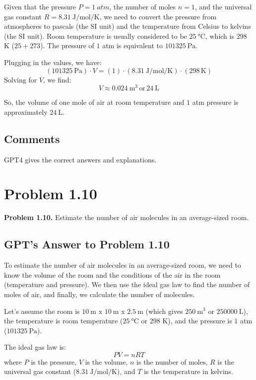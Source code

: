 \documentclass[12pt]{article}
\begin{document}
Given that the pressure \(P = \SI{1}{atm}\), the number of moles \(n = 1\), and the universal gas constant \(R = \SI{8.31}{\joule\per\mole\per\kelvin}\), we need to convert the pressure from atmospheres to pascals (the SI unit) and the temperature from Celsius to kelvins (the SI unit). Room temperature is usually considered to be \(\SI{25}{\degreeCelsius}\), which is \(298\) K (\(25 + 273\)). The pressure of \(1\) atm is equivalent to \(\SI{101325}{\pascal}\).

Plugging in the values, we have:
\[
(\SI{101325}{\pascal}) \cdot V = (1) \cdot (\SI{8.31}{\joule\per\mole\per\kelvin}) \cdot (298 \, \text{K})
\]
Solving for \(V\), we find:
\[
V \approx \SI{0.024}{\meter\cubed} \, \text{or} \, \SI{24}{\liter}
\]

So, the volume of one mole of air at room temperature and \(1\) atm pressure is approximately \(\SI{24}{\liter}\).

\subsection*{Comments}

GPT4 gives the correct answers and explanations.

\section*{Problem 1.10}

\textbf{Problem 1.10.} Estimate the number of air molecules in an average-sized room.

\subsection*{GPT's Answer to Problem 1.10}

To estimate the number of air molecules in an average-sized room, we need to know the volume of the room and the conditions of the air in the room (temperature and pressure). We then use the ideal gas law to find the number of moles of air, and finally, we calculate the number of molecules. 

Let's assume the room is \(\SI{10}{\meter}\) x \(\SI{10}{\meter}\) x \(\SI{2.5}{\meter}\) (which gives \(\SI{250}{\meter\cubed}\) or \(\SI{250000}{\liter}\)), the temperature is room temperature (\(\SI{25}{\degreeCelsius}\) or \(298\) K), and the pressure is \(1\) atm (\(\SI{101325}{\pascal}\)).

The ideal gas law is:
\[
PV = nRT
\]
where \(P\) is the pressure, \(V\) is the volume, \(n\) is the number of moles, \(R\) is the universal gas constant (\(\SI{8.31}{\joule\per\mole\per\kelvin}\)), and \(T\) is the temperature in kelvins.
\end{document}
